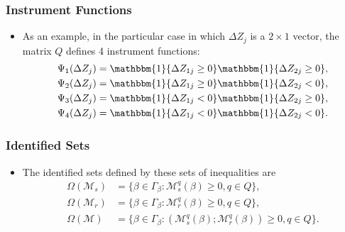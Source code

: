 \begin{frame}
\frametitle{Instrument Functions}

\begin{itemize}
	\item As an example, in the particular case in which $\Delta Z_{j}$ is a $2\times 1$ vector, the matrix $Q$ defines 4 instrument functions:
	\begin{align*}
	\Psi_{1}(\Delta Z_{j})&=\mathbbm{1}\{\Delta Z_{1j}\geq0\}\mathbbm{1}\{\Delta Z_{2j}\geq0\},\\
	\Psi_{2}(\Delta Z_{j})&=\mathbbm{1}\{\Delta Z_{1j}\geq0\}\mathbbm{1}\{\Delta Z_{2j}<0\},\\
	\Psi_{3}(\Delta Z_{j})&=\mathbbm{1}\{\Delta Z_{1j}<0\}\mathbbm{1}\{\Delta Z_{2j}\geq0\},\\
	\Psi_{4}(\Delta Z_{j})&=\mathbbm{1}\{\Delta Z_{1j}<0\}\mathbbm{1}\{\Delta Z_{2j}<0\}.
	\end{align*}
\end{itemize}
\end{frame}
\begin{frame}
\frametitle{Identified Sets}

\begin{itemize}
	\item The identified sets defined by these sets of inequalities are
	\begin{align*}
	\Omega(\mathcal{M}_{s})&=\{\beta\in\Gamma_{\beta}: \mathcal{M}^{q}_{s}(\beta)\geq 0, q\in Q\},\\
	\Omega(\mathcal{M}_{r})&=\{\beta\in\Gamma_{\beta}: \mathcal{M}^{q}_{r}(\beta)\geq 0, q\in Q\},\\
	\Omega(\mathcal{M})&=\{\beta\in\Gamma_{\beta}: (\mathcal{M}^{q}_{s}(\beta); \mathcal{M}^{q}_{r}(\beta))\geq 0,  q\in Q\}.
	\end{align*}
\end{itemize}
\end{frame}
